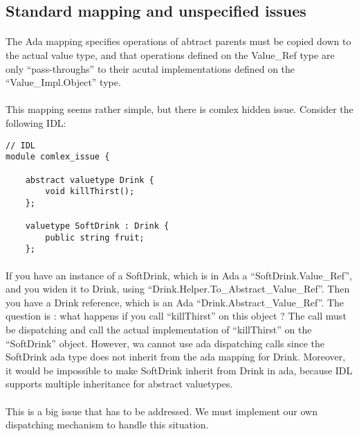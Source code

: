\subsection{Standard mapping and unspecified issues}
\paragraph{} The Ada mapping specifies operations of abtract parents
must be copied down to the actual value type, and that operations
defined on the Value\_Ref type are only ``pass-throughs'' to their
acutal implementations defined on the ``Value\_Impl.Object'' type.

\paragraph{}This mapping seems rather simple, but there is comlex
hidden issue. Consider the following IDL:

\begin{verbatim}
// IDL
module comlex_issue {

	abstract valuetype Drink {
		void killThirst();
	};

	valuetype SoftDrink : Drink {
		public string fruit;
	};
\end{verbatim}

\paragraph{} If you have an instance of a SoftDrink, which is in Ada a
``SoftDrink.Value\_Ref'', and you widen it to Drink, using
``Drink.Helper.To\_Abstract\_Value\_Ref''. Then you have a Drink
reference, which is an Ada ``Drink.Abstract\_Value\_Ref''. The
question is : what happens if you call ``killThirst'' on this object ?
The call must be dispatching and call the actual implementation of
``killThirst'' on the ``SoftDrink'' object. However, wa cannot use ada
dispatching calls since the SoftDrink ada type does not inherit from
the ada mapping for Drink. Moreover, it would be impossible to make
SoftDrink inherit from Drink in ada, because IDL supports multiple
inheritance for abstract valuetypes.

\paragraph{}This is a big issue that has to be addressed. We must
implement our own dispatching mechanism to handle this situation.

